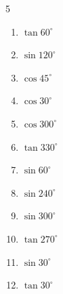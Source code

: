 \begin{multicols}{5}
\begin{enumerate}

  \item $\displaystyle \tan{60^\circ}$


  \item $\displaystyle \sin{120^\circ}$


\columnbreak %

\resetques

  \item $\displaystyle \cos{45^\circ}$


  \item $\displaystyle \cos{30^\circ}$


  \item $\displaystyle \cos{300^\circ}$


  \item $\displaystyle \tan{330^\circ}$


  \item $\displaystyle \sin{60^\circ}$


  \item $\displaystyle \sin{240^\circ}$


  \item $\displaystyle \sin{300^\circ}$


  \item $\displaystyle \tan{270^\circ}$

        \phantom{$\displaystyle なし$}

  \item $\displaystyle \sin{30^\circ}$


  \item $\displaystyle \tan{30^\circ}$


\end{enumerate}
\end{multicols}
